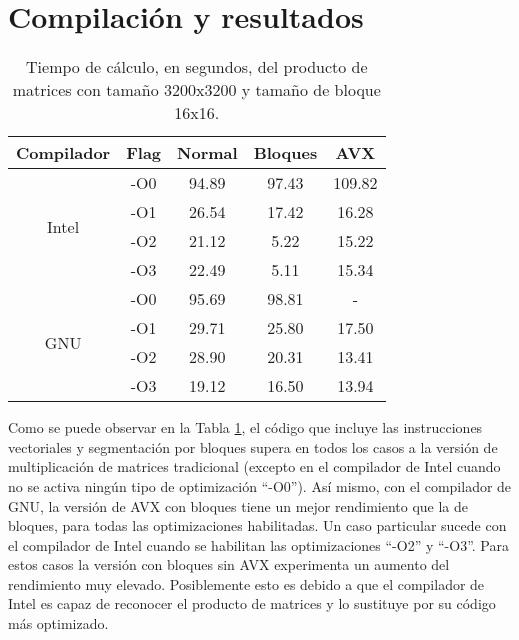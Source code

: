 \documentclass[11pt]{article}
\begin{document}
\section{Compilación y resultados}

\begin{table}[htb]
\centering
\begin{tabular}{ccccc}
\hline
\hline
Compilador             & Flag & Normal & Bloques & AVX    \\ \hline \hline
\multirow{4}{*}{Intel} & -O0  & 94.89  & 97.43   & 109.82 \\
                       & -O1  & 26.54  & 17.42   & 16.28  \\
                       & -O2  & 21.12  & 5.22    & 15.22  \\
                       & -O3  & 22.49  & 5.11    & 15.34  \\ \hline
\multirow{4}{*}{GNU}   & -O0  & 95.69  & 98.81   & -      \\
                       & -O1  & 29.71  & 25.80   & 17.50  \\
                       & -O2  & 28.90  & 20.31   & 13.41  \\
                       & -O3  & 19.12  & 16.50   & 13.94  \\ \hline
\end{tabular}
\caption{Tiempo de cálculo, en segundos, del producto de matrices con tamaño 3200x3200 y tamaño de bloque 16x16.}
\label{tab:my-table}
\end{table}

Como se puede observar en la Tabla \ref{tab:my-table}, el código que incluye las instrucciones vectoriales y segmentación por bloques supera en todos los casos a la versión de multiplicación de matrices tradicional (excepto en el compilador de Intel cuando no se activa ningún tipo de optimización ``-O0''). Así mismo, con el compilador de GNU, la versión de AVX con bloques tiene un mejor rendimiento que la de bloques, para todas las optimizaciones habilitadas. Un caso particular sucede con el compilador de Intel cuando se habilitan las optimizaciones ``-O2'' y ``-O3''. Para estos casos la versión con bloques sin AVX experimenta un aumento del rendimiento muy elevado. Posiblemente esto es debido a que el compilador de Intel es capaz de reconocer el producto de matrices y lo sustituye por su código más optimizado.
\end{document}
